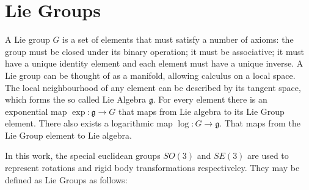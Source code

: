 

\section{Lie Groups}
\label{sec:lie_group}

A Lie group $G$ is a set of elements that must satisfy a number of axioms: the group must be closed under its binary operation; it must be associative; it must have a unique identity element and each element must have a unique inverse. A Lie group can be thought of as a manifold, allowing calculus on a local space.  The local neighbourhood of any element can be described by its tangent space, which forms the so called Lie Algebra $\mathfrak g$.  For every element there is an exponential map $\exp\colon \mathfrak g \to G$ that maps from Lie algebra to its Lie Group element.  There also exists a logarithmic map $\log\colon G \to \mathfrak g$.  That maps from the Lie Group element to Lie algebra.

In this work, the special euclidean groups $SO(3)$ and $SE(3)$ are used to represent rotations and rigid body transformations respectiveley.  They may be defined as Lie Groups as follows:
 
